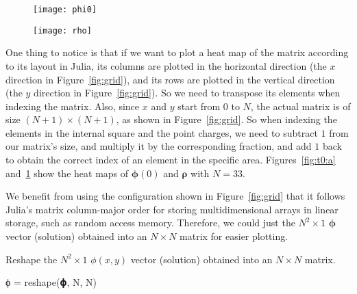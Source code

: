 \begin{figure}
    \centering
    \begin{minipage}[t]{0.49\linewidth}
        \centering
        \texttt{[image: phi0]}
        \label{fig:t0:a}
    \end{minipage}
    \hfill
    \begin{minipage}[t]{0.49\linewidth}
        \centering
        \texttt{[image: rho]}
        \label{fig:t0:b}
    \end{minipage}
\end{figure}

One thing to notice is that if we want to plot a heat map of
the matrix according to its layout in Julia, its columns are plotted in the
horizontal direction (the \(x\) direction in Figure~\ref{fig:grid}),
and its rows are plotted in the vertical direction
(the \(y\) direction in Figure~\ref{fig:grid}).
So we need to transpose its elements when indexing the matrix.
Also, since \(x\) and \(y\) start from \(0\) to \(N\), the actual matrix is of size
\((N + 1) \times (N + 1)\), as shown in Figure~\ref{fig:grid}.
So when indexing the elements in the internal square and the point charges,
we need to subtract \(1\) from our matrix's size, and multiply it by the corresponding
fraction, and add \(1\) back to obtain the correct index of an element in the
specific area.
Figures~\ref{fig:t0:a} and~\ref{fig:t0:b} show the heat maps of
\(\bm{\phi}(0)\) and \(\bm{\rho}\) with \(N = 33\).

We benefit from using the configuration shown in Figure~\ref{fig:grid} that it follows
Julia's matrix column-major order for storing multidimensional arrays in linear storage, such
as random access memory.
Therefore, we could just  the \(N^2 \times 1\) \(\bm{\phi}\) vector
(solution) obtained into an \(N \times N\) matrix for easier plotting.
%
\begin{algorithm}
    \caption{Reshape the \(N^2 \times 1\) \(\phi(x, y)\) vector
        (solution) obtained into an \(N \times N\) matrix.}
    \label{lst:reshape}
    \begin{juliacode}
ϕ = reshape(𝛟, N, N)
    \end{juliacode}
\end{algorithm}
